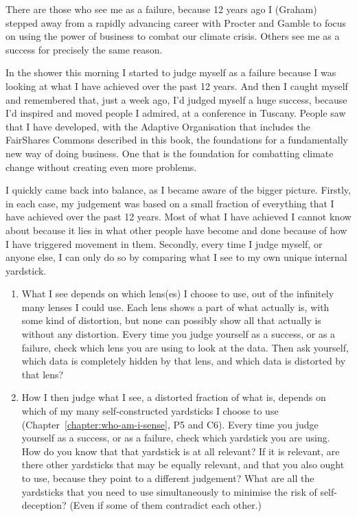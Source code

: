 \begin{longstoryblock}
There are those who see me as a failure, because 12 years ago I (Graham) stepped away from a rapidly advancing career with Procter and Gamble to focus on using the power of business to combat our climate crisis. Others see me as a success for precisely the same reason.


In the shower this morning I started to judge myself as a failure because I was looking at what I have achieved over the past 12 years. And then I caught myself and remembered that, just a week ago, I’d judged myself a huge success, because I'd inspired and moved people I admired, at a conference in Tuscany. People saw that I have developed, with the Adaptive Organisation that includes the FairShares Commons described in this book, the foundations for a fundamentally new way of doing business. One that is the foundation for combatting climate change without creating even more problems.


I quickly came back into balance, as I became aware of the bigger picture. Firstly, in each case, my judgement was based on a small fraction of everything that I have achieved over the past 12 years. Most of what I have achieved I cannot know about because it lies in what other people have become and done because of how I have triggered movement in them. Secondly, every time I judge myself, or anyone else, I can only do so by comparing what I see to my own unique internal yardstick.


\begin{enumerate}
\item What I see depends on which lens(es) I choose to use, out of the infinitely many lenses I could use. Each lens shows a part of what actually is, with some kind of distortion, but none can possibly show all that actually is without any distortion. Every time you judge yourself as a success, or as a failure, check which lens you are using to look at the data. Then ask yourself, which data is completely hidden by that lens, and which data is distorted by that lens?
\item How I then judge what I see, a distorted fraction of what is, depends on which of my many self-constructed yardsticks I choose to use (Chapter~\ref{chapter:who-am-i-sense}, P5 and C6). Every time you judge yourself as a success, or as a failure, check which yardstick you are using. How do you know that that yardstick is at all relevant? If it is relevant, are there other yardsticks that may be equally relevant, and that you also ought to use, because they point to a different judgement? What are all the yardsticks that you need to use simultaneously to minimise the risk of self-deception? (Even if some of them contradict each other.)
\end{enumerate}


\end{longstoryblock}


